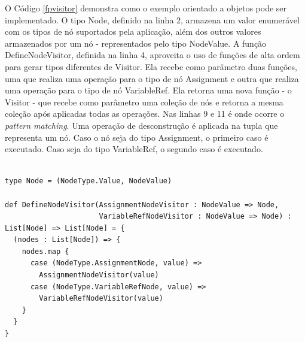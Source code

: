 O Código \ref{fpvisitor} demonstra como o 
exemplo orientado a objetos pode ser implementado. 
O tipo Node, definido na linha 2, armazena um valor 
enumerável com os tipos de nó suportados 
pela aplicação, além dos outros valores 
armazenados por um nó - representados pelo tipo 
NodeValue. A função DefineNodeVisitor, definida 
na linha 4, aproveita o uso de funções de alta ordem 
para gerar tipos diferentes de Visitor. Ela 
recebe como parâmetro duas funções, uma que 
realiza uma operação para o tipo de nó Assignment e 
outra que realiza uma operação para o tipo de 
nó VariableRef. Ela retorna uma nova função - o 
Visitor - que recebe como parâmetro uma coleção 
de nós e retorna a mesma coleção após aplicadas 
todas as operações. Nas linhas 9 e 11 é onde 
ocorre o \textit{pattern matching}. Uma operação 
de desconstrução é aplicada na tupla que representa 
um nó. Caso o nó seja do tipo Assignment, o 
primeiro caso é executado. Caso seja do tipo 
VariableRef, o segundo caso é executado.

\begin{lstlisting}[caption={Visitor Funcional},label=fpvisitor]
    
type Node = (NodeType.Value, NodeValue)

def DefineNodeVisitor(AssignmentNodeVisitor : NodeValue => Node,
                      VariableRefNodeVisitor : NodeValue => Node) :
List[Node] => List[Node] = {
  (nodes : List[Node]) => {
    nodes.map {
      case (NodeType.AssignmentNode, value) => 
        AssignmentNodeVisitor(value)
      case (NodeType.VariableRefNode, value) => 
        VariableRefNodeVisitor(value)
    }
  }
}
    
\end{lstlisting}